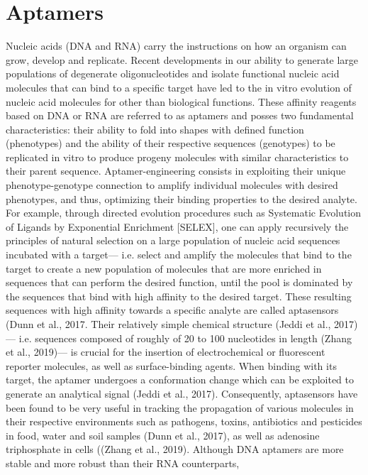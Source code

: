 \documentclass{article}
\begin{document}
\section{Aptamers}
Nucleic acids (DNA and RNA) carry the instructions on 
how an organism can grow, develop and replicate. Recent
 developments in our ability to generate large populations of 
 degenerate oligonucleotides and isolate functional nucleic acid 
 molecules that can bind to a specific target have led to the in 
 vitro evolution of nucleic acid molecules for other than biological functions. 
 These affinity reagents based on DNA or RNA are referred to as aptamers 
 and posses two fundamental characteristics: their ability to fold 
 into shapes with defined function (phenotypes) and the ability of 
 their respective sequences (genotypes) to be replicated in vitro to 
 produce progeny molecules with similar characteristics to their 
 parent sequence. Aptamer-engineering consists in exploiting their 
 unique phenotype-genotype connection to amplify individual molecules 
 with desired phenotypes, and thus, optimizing their binding properties 
 to the desired analyte.  For example, through directed evolution 
 procedures such as Systematic Evolution of Ligands by Exponential 
 Enrichment [SELEX], one can apply recursively the principles of 
 natural selection on a large population of nucleic acid sequences 
 incubated with a target— i.e. select and amplify the molecules 
 that bind to the target to create a new population of molecules 
 that are more enriched in sequences that can perform the desired 
 function, until the pool is dominated by the sequences that bind 
 with high affinity to the desired target. These resulting sequences 
 with high affinity towards a specific analyte are called aptasensors 
 (Dunn et al., 2017. Their relatively simple chemical structure 
 (Jeddi et al., 2017)— i.e. sequences composed of roughly of 20 to 
 100 nucleotides in length (Zhang et al., 2019)— is crucial for the 
 insertion of electrochemical or fluorescent reporter molecules, as 
 well as surface-binding agents. When binding with its target, the 
 aptamer undergoes a conformation change which can be exploited to 
 generate an analytical signal (Jeddi et al., 2017). Consequently, 
 aptasensors have been found to be very useful in tracking the propagation 
 of various molecules in their respective environments such as pathogens, 
 toxins, antibiotics and pesticides in food, water and soil samples (Dunn et al., 2017),
  as well as adenosine triphosphate in cells ((Zhang et al., 2019).  
Although DNA aptamers are more stable and more robust than their RNA counterparts, 
\end{document}
